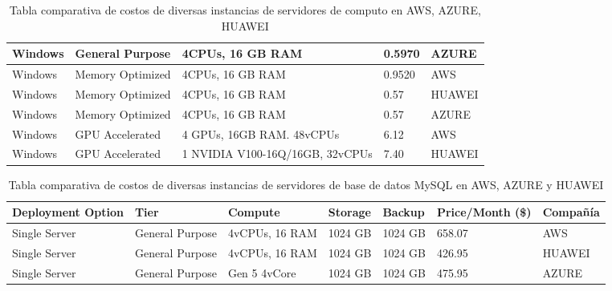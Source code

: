 \documentclass[12pt,a4paper,openright]{article}
\begin{document}
\begin{table}[ht]
\begin{adjustbox}{width=\textwidth}
\begin{tabular}{|l|l|l|l|l|}
Windows                      & General Purpose                            & 4CPUs, 16 GB RAM                      &  0.5970 & AZURE       \\ \hline
Windows                      & Memory Optimized                           & 4CPUs, 16 GB RAM                      & 0.9520                                                & AWS                                \\ \hline
Windows                      & Memory Optimized                           & 4CPUs, 16 GB RAM                      & 0.57                                                  & HUAWEI                             \\ \hline
Windows                      & Memory Optimized                           & 4CPUs, 16 GB RAM                      & 0.57                                                  & {\color[HTML]{212121} AZURE}       \\ \hline
Windows                      & GPU Accelerated                            & 4 GPUs, 16GB RAM. 48vCPUs             & 6.12                                                  & AWS                                \\ \hline
Windows                      & GPU Accelerated                            & 1 NVIDIA V100-16Q/16GB, 32vCPUs       &  7.40   & HUAWEI    \\ \hline                  
\end{tabular}
\end{adjustbox}
\caption{Tabla comparativa de costos de diversas instancias de servidores de computo en AWS, AZURE, HUAWEI} 
\end{table}

\begin{table}[ht]
\begin{adjustbox}{width=\textwidth}
\begin{tabular}{|l|l|l|l|l|l|l|}
\hline 
\textbf{Deployment Option} & \textbf{Tier}   & \textbf{Compute} & \textbf{Storage} & \textbf{Backup} & \textbf{Price/Month (\$)} & \textbf{Compañía} \\  \hline \hline
Single Server              & General Purpose & 4vCPUs, 16 RAM   & 1024 GB          & 1024 GB         & 658.07                    & AWS               \\ \hline
Single Server              & General Purpose & 4vCPUs, 16 RAM   & 1024 GB          & 1024 GB         & 426.95                    & HUAWEI            \\ \hline
Single Server              & General Purpose & Gen 5 4vCore     & 1024 GB          & 1024 GB         & 475.95                    & AZURE             \\ \hline
\end{tabular}
\end{adjustbox}
\caption{Tabla comparativa de costos de diversas instancias de servidores de base de datos MySQL en AWS, AZURE y HUAWEI}
\end{table}
\end{document}

